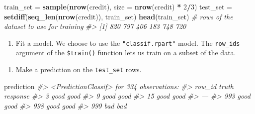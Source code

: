 \documentclass[]{article}
\newenvironment{Shaded}{\begin{snugshade}}{\end{snugshade}}
\newcommand{\CommentTok}[1]{\textcolor[rgb]{0.56,0.35,0.01}{\textit{#1}}}
\newcommand{\DataTypeTok}[1]{\textcolor[rgb]{0.13,0.29,0.53}{#1}}
\newcommand{\DecValTok}[1]{\textcolor[rgb]{0.00,0.00,0.81}{#1}}
\newcommand{\KeywordTok}[1]{\textcolor[rgb]{0.13,0.29,0.53}{\textbf{#1}}}
\newcommand{\NormalTok}[1]{#1}
\newcommand{\OperatorTok}[1]{\textcolor[rgb]{0.81,0.36,0.00}{\textbf{#1}}}
\newcommand{\StringTok}[1]{\textcolor[rgb]{0.31,0.60,0.02}{#1}}
\providecommand{\tightlist}{%
  \setlength{\itemsep}{0pt}\setlength{\parskip}{0pt}}
\begin{document}
\begin{Shaded}
\begin{Highlighting}[]
\NormalTok{train_set =}\StringTok{ }\KeywordTok{sample}\NormalTok{(}\KeywordTok{nrow}\NormalTok{(credit), }\DataTypeTok{size =} \KeywordTok{nrow}\NormalTok{(credit) }\OperatorTok{*}\StringTok{ }\DecValTok{2}\OperatorTok{/}\DecValTok{3}\NormalTok{)}
\NormalTok{test_set =}\StringTok{ }\KeywordTok{setdiff}\NormalTok{(}\KeywordTok{seq_len}\NormalTok{(}\KeywordTok{nrow}\NormalTok{(credit)), train_set)}
\KeywordTok{head}\NormalTok{(train_set)  }\CommentTok{# rows of the dataset to use for training}
\CommentTok{#> [1] 820 797 406 183 748 720}
\end{Highlighting}
\end{Shaded}

\begin{enumerate}
\def\labelenumi{\arabic{enumi}.}
\setcounter{enumi}{1}
\tightlist
\item
  Fit a model. We choose to use the \texttt{"classif.rpart"} model. The
  \texttt{row\_ids} argument of the \texttt{\$train()} function lets us
  train on a subset of the data.
\end{enumerate}

\begin{Shaded}
\end{Shaded}

\begin{enumerate}
\def\labelenumi{\arabic{enumi}.}
\setcounter{enumi}{2}
\tightlist
\item
  Make a prediction on the \texttt{test\_set} rows.
\end{enumerate}

\begin{Shaded}
\end{Shaded}

\begin{Shaded}
\begin{Highlighting}[]
\NormalTok{prediction}
\CommentTok{#> <PredictionClassif> for 334 observations:}
\CommentTok{#>     row_id truth response}
\CommentTok{#>          3  good     good}
\CommentTok{#>          9  good     good}
\CommentTok{#>         15  good     good}
\CommentTok{#> ---                      }
\CommentTok{#>        993  good     good}
\CommentTok{#>        998  good     good}
\CommentTok{#>        999   bad      bad}
\end{Highlighting}
\end{Shaded}
\end{document}
